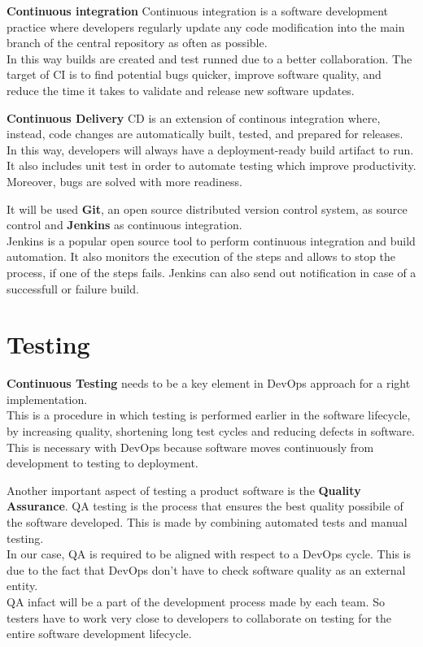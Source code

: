 \textbf{Continuous integration}
Continuous integration is a software development practice where developers regularly update any code modification into the main branch of the central repository as often as possible.\\ 
In this way builds are created and test runned due to a better collaboration. The target of CI is to find potential bugs quicker, improve software quality, and reduce the time it takes to validate and release new software updates.
\par
\textbf{Continuous Delivery} 
CD is an extension of continous integration where, instead, code changes are automatically built, tested, and prepared for releases.\\ 
In this way, developers will always have a deployment-ready build artifact to run. It also includes unit test in order to automate testing which improve productivity. Moreover, bugs are solved with more readiness.
\par

It will be used \textbf{Git}, an open source distributed version control system, as source control and \textbf{Jenkins} as continuous integration.\\
Jenkins is a popular open source tool to perform continuous integration and build automation.
It also monitors the execution of the steps and allows to stop the process, if one of the steps fails. Jenkins can also send out notification in case of a successfull or failure build.

 
\section{Testing}

\textbf{Continuous Testing} needs to be a key element in DevOps approach for a right implementation. \\
This is a procedure in which testing is performed earlier in the software lifecycle, by increasing quality, shortening long test cycles and reducing defects in software.\\
This is necessary with DevOps because software moves continuously from development to testing to deployment.
\par
Another important aspect of testing a product software is the \textbf{Quality Assurance}.
QA testing is the process that ensures the best quality possibile of the software developed. This is made by combining automated tests and manual testing.\\ 
In our case, QA is required to be aligned with respect to a DevOps cycle.
This is due to the fact that DevOps don't have to check software quality as an external entity.\\
QA infact will be a part of the development process made by each team. 
So testers have to work very close to developers to collaborate on testing for the entire software development lifecycle.














